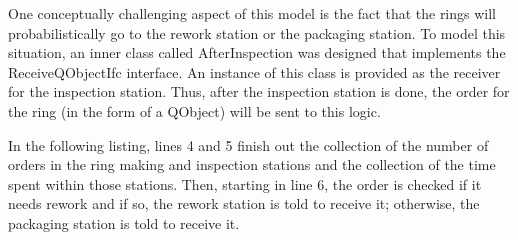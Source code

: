 \documentclass[
]{book}
\theoremstyle{definition}
\theoremstyle{definition}
\theoremstyle{definition}
\theoremstyle{definition}
\theoremstyle{remark}
\begin{document}
One conceptually challenging aspect of this model is the fact that the
rings will probabilistically go to the rework station or the packaging
station. To model this situation, an inner class called AfterInspection
was designed that implements the ReceiveQObjectIfc interface. An
instance of this class is provided as the receiver for the inspection
station. Thus, after the inspection station is done,
the order for the ring (in the form of a QObject) will be sent to this
logic.

In the following listing, lines 4 and 5 finish out the collection of
the number of orders in the ring making and inspection stations and the
collection of the time spent within those stations. Then, starting in
line 6, the order is checked if it needs rework and if so, the rework
station is told to receive it; otherwise, the packaging station is told
to receive it.
\end{document}
